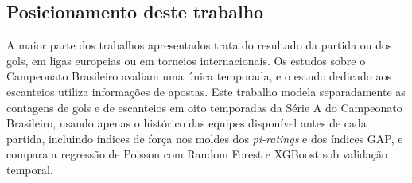 \subsection{Posicionamento deste trabalho}\label{subsec:RelPosicionamento}

A maior parte dos trabalhos apresentados trata do resultado da partida ou dos gols, em ligas europeias ou em torneios internacionais. Os estudos sobre o Campeonato Brasileiro avaliam uma única temporada, e o estudo dedicado aos escanteios utiliza informações de apostas. Este trabalho modela separadamente as contagens de gols e de escanteios em oito temporadas da Série A do Campeonato Brasileiro, usando apenas o histórico das equipes disponível antes de cada partida, incluindo índices de força nos moldes dos \textit{pi-ratings} e dos índices GAP, e compara a regressão de Poisson com Random Forest e XGBoost sob validação temporal.
